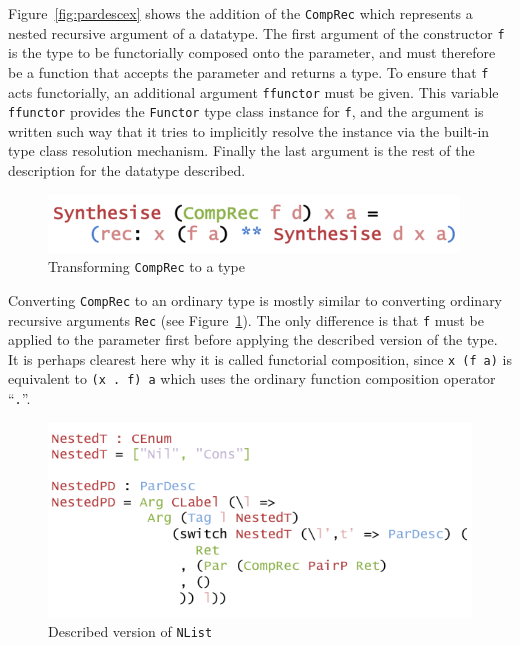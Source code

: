 \documentclass{ituthesis}
\newcommand{\ttconstructor}[1]{\textcolor{constructor-color}{\texttt{#1}}}
\newcommand{\tttype}[1]{\textcolor{type-color}{\texttt{#1}}}
\newcommand{\ttvar}[1]{\textcolor{local-var-color}{\texttt{#1}}}
\theoremstyle{break}
\begin{document}
Figure~\ref{fig:pardescex} shows the addition of the \ttconstructor{CompRec} which represents a nested recursive argument of a datatype.
The first argument of the constructor \ttvar{f} is the type to be functorially composed onto the parameter, and must therefore be a function that accepts the parameter
and returns a type.
To ensure that \ttvar{f} acts functorially, an additional argument \ttvar{ffunctor} must be given.
This variable \ttvar{ffunctor} provides the \tttype{Functor} type class instance for \ttvar{f}, and the argument is written such way that it tries to implicitly resolve the instance via the built-in type class resolution mechanism.
Finally the last argument is the rest of the description for the datatype described.

\begin{figure}[ht]
\begin{center}
    \includegraphics[scale=0.5]{Figures/ParSynthesisingExtended.png}
\end{center}
\caption{Transforming \ttconstructor{CompRec} to a type}
\label{fig:parsynthex}
\end{figure}

Converting \ttconstructor{CompRec} to an ordinary type is mostly similar to converting ordinary recursive arguments \ttconstructor{Rec} (see Figure~\ref{fig:parsynthex}).
The only difference is that \ttvar{f} must be applied to the parameter first before applying the described version of the type.
It is perhaps clearest here why it is called functorial composition, since \ttvar{x}~\texttt{(}\ttvar{f}~\ttvar{a}\texttt{)} is equivalent to \texttt{(}\ttvar{x}~\texttt{.}~\ttvar{f}\texttt{)}~\ttvar{a} which uses
the ordinary function composition operator ``\texttt{.}''.

\begin{figure}[ht]
\begin{center}
    \includegraphics[scale=0.5]{Figures/NestedListDescription}
\end{center}
\caption{Described version of \tttype{NList}}
\label{fig:nlistdesc}
\end{figure}
\end{document}
